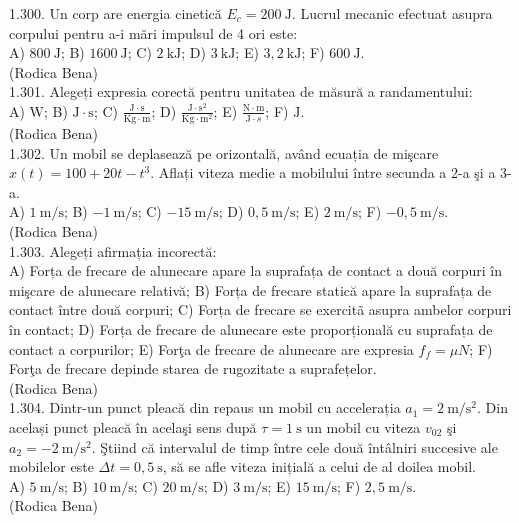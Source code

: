 1.300. Un corp are energia cinetică $E_{c}=200 \mathrm{~J}$. Lucrul mecanic efectuat asupra corpului pentru a-i mări impulsul de 4 ori este:\\ A) $800 \mathrm{~J}$; B) $1600 \mathrm{~J}$; C) $2 \mathrm{~kJ}$; D) $3 \mathrm{~kJ}$; E) $3,2 \mathrm{~kJ}$; F) $600 \mathrm{~J}$.\\ (Rodica Bena)\\

1.301. Alegeți expresia corectă pentru unitatea de măsură a randamentului:\\ A) $\mathrm{W}$; B) $\mathrm{J} \cdot \mathrm{s}$; C) $\frac{\mathrm{J} \cdot \mathrm{s}}{\mathrm{Kg} \cdot \mathrm{m}}$; D) $\frac{\mathrm{J} \cdot \mathrm{s}^{2}}{\mathrm{Kg} \cdot \mathrm{m}^{2}}$; E) $\frac{\mathrm{N} \cdot \mathrm{m}}{\mathrm{J} \cdot s}$; F) $\mathrm{J}$.\\ (Rodica Bena)\\

1.302. Un mobil se deplasează pe orizontală, având ecuația de mişcare $x(t)=100+20 t-t^{3}$. Aflați viteza medie a mobilului între secunda a 2-a şi a 3-a.\\ A) $1 \mathrm{~m} / \mathrm{s}$; B) $-1 \mathrm{~m} / \mathrm{s}$; C) $-15 \mathrm{~m} / \mathrm{s}$; D) $0,5 \mathrm{~m} / \mathrm{s}$; E) $2 \mathrm{~m} / \mathrm{s}$; F) $-0,5 \mathrm{~m} / \mathrm{s}$.\\ (Rodica Bena)\\

1.303. Alegeți afirmația incorectă:\\ A) Forța de frecare de alunecare apare la suprafața de contact a două corpuri în mişcare de alunecare relativă; B) Forța de frecare statică apare la suprafața de contact între două corpuri; C) Forța de frecare se exercitã asupra ambelor corpuri în contact; D) Forța de frecare de alunecare este proporțională cu suprafața de contact a corpurilor; E) Forţa de frecare de alunecare are expresia $f_{f}=\mu N$; F) Forţa de frecare depinde starea de rugozitate a suprafețelor.\\ (Rodica Bena)\\

1.304. Dintr-un punct pleacă din repaus un mobil cu accelerația $a_{1}=2 \mathrm{~m} / \mathrm{s}^{2}$. Din același punct pleacă în acelaşi sens după $\tau=1 \mathrm{~s}$ un mobil cu viteza $v_{02}$ şi $a_{2}=-2 \mathrm{~m} / \mathrm{s}^{2}$. Ştiind că intervalul de timp între cele două întâlniri succesive ale mobilelor este $\Delta t=0,5 \mathrm{~s}$, să se afle viteza inițială a celui de al doilea mobil.\\ A) $5 \mathrm{~m} / \mathrm{s}$; B) $10 \mathrm{~m} / \mathrm{s}$; C) $20 \mathrm{~m} / \mathrm{s}$; D) $3 \mathrm{~m} / \mathrm{s}$; E) $15 \mathrm{~m} / \mathrm{s}$; F) $2,5 \mathrm{~m} / \mathrm{s}$.\\ (Rodica Bena)\\

